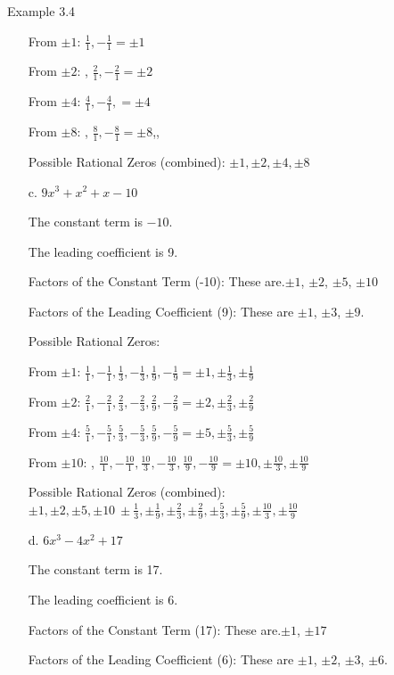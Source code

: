 \begin{example}{Example 3.4}
\begin{enumerate}
  From $\pm 1$: $\frac{1}{1}, -\frac{1}{1} = \pm 1$

  From $\pm 2$: , $\frac{2}{1}, -\frac{2}{1} = \pm 2$

  From $\pm 4$: $\frac{4}{1}, -\frac{4}{1}, = \pm 4$

  From $\pm 8$: , $\frac{8}{1}, -\frac{8}{1} = \pm 8$,,

  Possible Rational Zeros (combined): $\pm 1, \pm 2, \pm 4, \pm 8$

  \item[c.] $9x^3 + x^2 + x - 10$

  The constant term is $-10$.

  The leading coefficient is 9.

  Factors of the Constant Term (-10): These are.$\pm 1$, $\pm 2$, $\pm 5$, $\pm 10$

  Factors of the Leading Coefficient (9): These are $\pm 1$, $\pm 3$, $\pm 9$.

  Possible Rational Zeros:

  From $\pm 1$: $\frac{1}{1}, -\frac{1}{1}, \frac{1}{3}, -\frac{1}{3}, \frac{1}{9},
  -\frac{1}{9} = \pm 1, \pm\frac{1}{3}, \pm\frac{1}{9}$

  From $\pm 2$: $\frac{2}{1}, -\frac{2}{1}, \frac{2}{3}, -\frac{2}{3}, \frac{2}{9},
  -\frac{2}{9} = \pm 2, \pm\frac{2}{3}, \pm\frac{2}{9}$

  From $\pm 4$: $\frac{5}{1}, -\frac{5}{1}, \frac{5}{3}, -\frac{5}{3}, \frac{5}{9},
  -\frac{5}{9} = \pm 5, \pm\frac{5}{3}, \pm\frac{5}{9}$

  From $\pm 10$: , $\frac{10}{1}, -\frac{10}{1}, \frac{10}{3}, -\frac{10}{3},
  \frac{10}{9}, -\frac{10}{9} = \pm 10, \pm\frac{10}{3}, \pm\frac{10}{9}$

  Possible Rational Zeros (combined): $\pm 1, \pm 2, \pm 5, \pm 10\ \pm\frac{1}{3},
  \pm\frac{1}{9}, \pm\frac{2}{3}, \pm\frac{2}{9}, \pm\frac{5}{3}, \pm\frac{5}{9},
  \pm\frac{10}{3}, \pm\frac{10}{9}$

  \item[d.] $6x^3 - 4x^2 + 17$

  The constant term is 17.

  The leading coefficient is 6.

  Factors of the Constant Term (17): These are.$\pm 1$, $\pm 17$

  Factors of the Leading Coefficient (6): These are $\pm 1$, $\pm 2$, $\pm 3$, $\pm 6$.


\end{enumerate}
\end{example}
